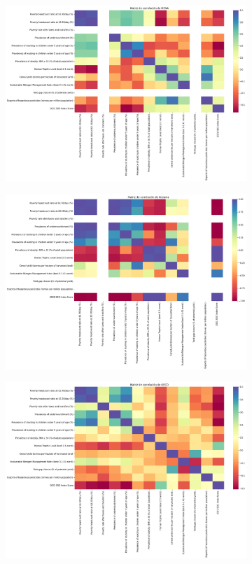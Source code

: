 \documentclass[a4paper,12pt]{amsart}
\begin{document}
\begin{figure}[!h]
        \centering
        \begin{subfigure}{0.49\textwidth}
            \includegraphics[width=\linewidth]{Images/Corr_MENA.png}
        \end{subfigure}
        \begin{subfigure}{0.49\textwidth}
            \includegraphics[width=\linewidth]{Images/Corr_oceania.png}
        \end{subfigure}
        \begin{subfigure}{0.49\textwidth}
            \includegraphics[width=\linewidth]{Images/Corr_oecd.png}

\end{subfigure}
\end{figure}
\end{document}
